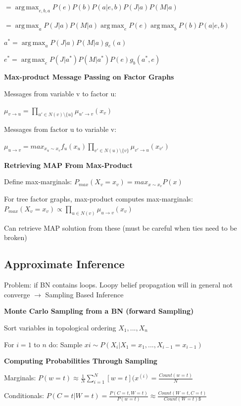 \documentclass[a4paper, 11pt, landscape]{article}
\DeclareMathOperator*{\argmax}{arg\,max}
\begin{document}
\begin{multicols*}{3}
$= \argmax_{e , b, a} P(e)P(b)P(a|e,b)P(J|a)P(M|a)$

$= \argmax_{a} P(J|a)P(M|a)  \argmax_{e} P(e)  \argmax_{b} P(b)P(a|e,b)$

$a^{*} = \argmax_{a} P(J|a)P(M|a) g_e(a)$

$e^{*} = \argmax_{e} P(J|a^*)P(M|a^*) P(e) g_b(a^*,e)$


\textbf{Max-product Message Passing on Factor Graphs}

Messages from variable v to factor u: 

$\mu_{v \rightarrow u} = \prod_{u' \in N(v) \setminus \{u\}} \mu_{u' \rightarrow v}(x_{v})$ 

Messages from factor u to variable v:

$\mu_{u \rightarrow v} = max_{x_u \sim x_v} f_u(x_u) \prod_{v' \in N(u) \setminus \{v\}} \mu_{v' \rightarrow u}(x_{v'})$ 
 
 \textbf{Retrieving MAP From Max-Product}
 \begin{compactitem}
 \item Define max-marginals: $P_{max}(X_v =x_v)=max_{x \sim x_v} P(x)$
 \item For tree factor graphs, max-product computes max-marginals: 
 $P_{max}(X_v = x_v) \propto \prod_{u \in N(v)} \mu_{u \rightarrow v} (x_v)$ 
\item Can retrieve MAP solution from these (must be careful when ties need to be broken)
\end{compactitem}
\subsection{Approximate Inference}
Problem: if BN contains loops.
Loopy belief propagation will in general not converge	$\rightarrow$ Sampling Based Inference

\textbf{Monte Carlo Sampling from a BN (forward Sampling)}
\begin{compactitem}
	\item Sort variables in topological ordering $X_1,...,X_n$
	\item For $i=1$ to 	$n$ do: Sample $xi \sim P(X_i | X_1=x_1, ..., X_{i-1}=x_{i-1})$
\end{compactitem}

\textbf{Computing Probabilities Through Sampling}

Marginals: $P(w=t) \approx \frac{1}{N} \sum_{i=1}^{N}[w=t](x^{(i)} =\frac{ Count(w=t)}{N}$

Conditionals: $P(C=t | W=t) = \frac{P(C=t, W=t)}{P(w=t)} \approx \frac{Count(W=t, C=t)}{Count(W=t)ß}$


\end{multicols*}
\end{document}
